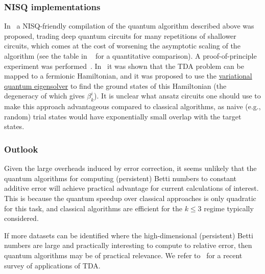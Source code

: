 \begin{refsection}
\subsubsection*{NISQ implementations}
In~\cite{akhalwaya2022exponential} a NISQ-friendly compilation of the quantum algorithm described above was proposed, trading deep quantum circuits for many repetitions of shallower circuits, which comes at the cost of worsening the asymptotic scaling of the algorithm (see the table in ~\cite{mcardle2022streamlinedTDA} for a quantitative comparison). A proof-of-principle experiment was performed~\cite{akhalwaya2022exponential}. In~\cite{cade2021complexity} it was shown that the TDA problem can be mapped to a fermionic Hamiltonian, and it was proposed to use the \hyperref[prim:VQA]{variational quantum eigensolver} to find the ground states of this Hamiltonian (the degeneracy of which gives $\beta_k^i$). It is unclear what ansatz circuits one should use to make this approach advantageous compared to classical algorithms, as naive (e.g., random) trial states would have exponentially small overlap with the target states.


\subsubsection*{Outlook}
Given the large overheads induced by error correction, it seems unlikely that the quantum algorithms for computing (persistent) Betti numbers to constant additive error will achieve practical advantage for current calculations of interest. This is because the quantum speedup over classical approaches is only quadratic for this task, and classical algorithms are efficient for the $ k \leq 3$ regime typically considered.

If more datasets can be identified where the high-dimensional (persistent) Betti numbers are large and practically interesting to compute to relative error, then quantum algorithms may be of practical relevance. We refer to~\cite{hensel2021survey} for a recent survey of applications of TDA.

\printbibliography[heading=secbib,segment=\therefsegment]
\end{refsection}


\newpage


